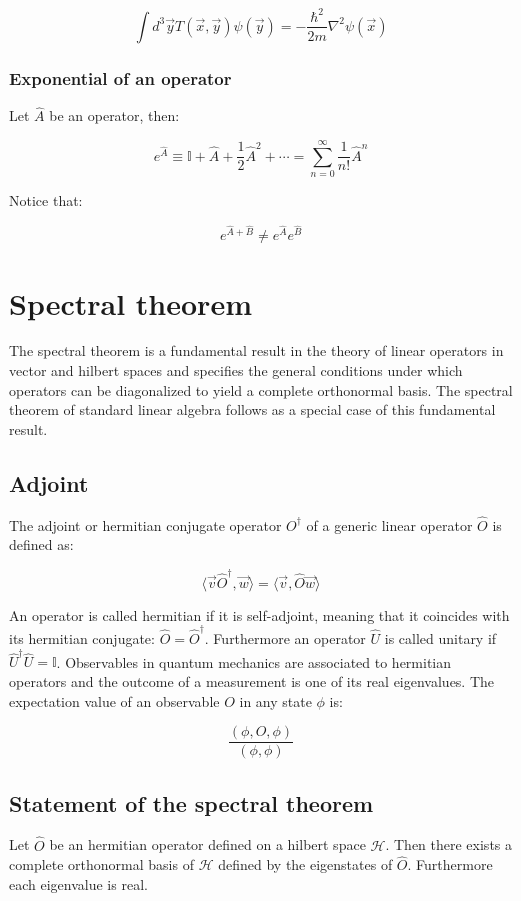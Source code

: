 		$$\int d^3\vec{y}T(\vec{x}, \vec{y})\psi(\vec{y}) = -\frac{\hbar^2}{2m}\nabla^2\psi(\vec{x})$$

		\subsubsection{Exponential of an operator}
		Let $\hat{A}$ be an operator, then:

		$$e^{\hat{A}} \equiv\mathbb{I} + \hat{A} + \frac{1}{2}\hat{A}^2+\cdots = \sum\limits_{n=0}^\infty\frac{1}{n!}\hat{A}^n$$

		Notice that:

		$$e^{\hat{A} + \hat{B}} \neq e^{\hat{A}}e^{\hat{B}}$$

\section{Spectral theorem}
The spectral theorem is a fundamental result in the theory of linear operators in vector and hilbert spaces and specifies the general conditions under which operators can be diagonalized to yield a complete orthonormal basis.
The spectral theorem of standard linear algebra follows as a special case of this fundamental result.

	\subsection{Adjoint}
	The adjoint or hermitian conjugate operator $O^\dagger$ of a generic linear operator $\hat{O}$ is defined as:

	$$\langle \vec{v}\hat{O}^\dagger, \vec{w}\rangle = \langle\vec{v}, \hat{O}\vec{w}\rangle$$

	An operator is called hermitian if it is self-adjoint, meaning that it coincides with its hermitian conjugate: $\hat{O} = \hat{O}^\dagger$.
	Furthermore an operator $\hat{U}$ is called unitary if $\hat{U}^\dagger\hat{U} = \mathbb{I}$.
	Observables in quantum mechanics are associated to hermitian operators and the outcome of a measurement is one of its real eigenvalues.
	The expectation value of an observable $O$ in any state $\phi$ is:

	$$\frac{(\phi,O,\phi)}{(\phi,\phi)}$$

	\subsection{Statement of the spectral theorem}
	Let $\hat{O}$ be an hermitian operator defined on a hilbert space $\mathcal{H}$.
	Then there exists a complete orthonormal basis of $\mathcal{H}$ defined by the eigenstates of $\hat{O}$.
	Furthermore each eigenvalue is real.

